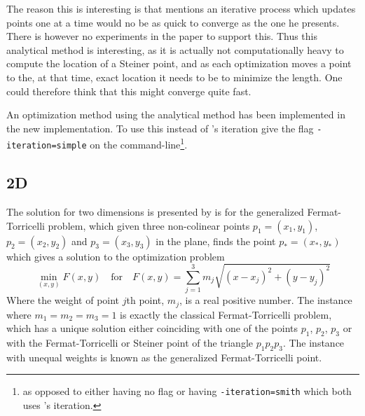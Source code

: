 The reason this is interesting is that \textcite{smith1992} mentions an
iterative process which updates points one at a time would no be as quick to
converge as the one he presents. There is however no experiments in the paper to
support this. Thus this analytical method is interesting, as it is actually not
computationally heavy to compute the location of a Steiner point, and as
each optimization moves a point to the, at that time, exact location it needs to
be to minimize the length. One could therefore think that this might converge
quite fast.

An optimization method using the analytical method has been implemented in the
new implementation. To use this instead of \citeauthor{smith1992}'s iteration
give the flag \texttt{-iteration=simple} on the command-line\footnote{as opposed
  to either having no flag or having \texttt{-iteration=smith} which both uses
  \citeauthor{smith1992}'s iteration.}.

\subsection{2D}
\label{sec:2d}

The solution for two dimensions is presented by \textcite{uteshev2014} is for
the generalized Fermat-Torricelli problem, which given three non-colinear points
$p_1 = (x_1, y_1)$, $p_2 = (x_2, y_2)$ and $p_3 = (x_3, y_3)$ in the plane,
finds the point $p_\ast = (x_\ast, y_\ast)$ which gives a solution to the
optimization problem
%
\begin{equation}
  \min_{(x,y)} F(x,y) \quad \text{for} \quad F(x,y) = \sum_{j=1}^3 m_j
  \sqrt{{(x-x_j)}^2 + {(y-y_j)}^2}
\end{equation}
%
Where the weight of point $j$th point, $m_j$, is a real positive number. The
instance where $m_1 = m_2 = m_3 = 1$ is exactly the classical Fermat-Torricelli
problem, which has a unique solution either coinciding with one of the points
$p_1$, $p_2$, $p_3$ or with the Fermat-Torricelli or Steiner point of the
triangle $p_1 p_2 p_3$. The instance with unequal weights is known as the
generalized Fermat-Torricelli point.

